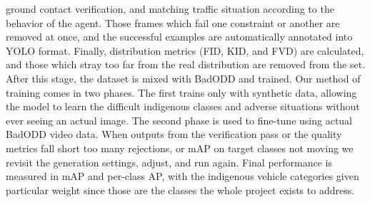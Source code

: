 ground contact verification, and matching traffic situation according to the behavior
of the agent. Those frames which fail one constraint or another are removed at once,
and the successful examples are automatically annotated into YOLO format. Finally,
distribution metrics (FID, KID, and FVD) are calculated, and those which stray too
far from the real distribution are removed from the set. After this stage, the dataset
is mixed with BadODD and trained. Our method of training comes in two phases. The
first trains only with synthetic data, allowing the model to learn the difficult
indigenous classes and adverse situations without ever seeing an actual image. The second phase is used to fine-tune using actual BadODD video data. When outputs from the verification pass or the quality metrics fall short too many rejections, or mAP on target classes not moving we revisit the generation settings, adjust, and run again. Final performance is measured in mAP and per-class AP, with the indigenous vehicle categories given particular weight since those are the classes the whole project exists to address.